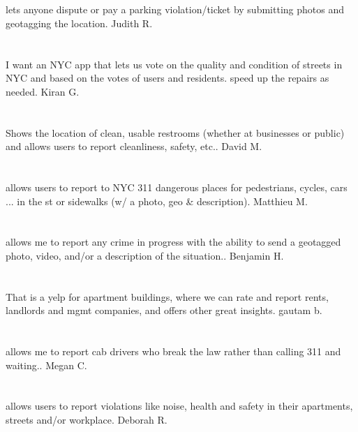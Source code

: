 \section{}lets anyone dispute or pay a parking violation/ticket by submitting photos and geotagging the location. Judith R.
\section{} I want an NYC app that lets us vote on the quality and condition of streets in NYC and based on the votes of users and residents.  speed up the repairs as needed.  Kiran G.
\section{}Shows the location of clean,  usable restrooms (whether at businesses or public) and allows users to report cleanliness,  safety,  etc.. David M.
\section{}allows users to report to NYC 311 dangerous places for pedestrians,  cycles,  cars ... in the st or sidewalks (w/ a photo,  geo \& description). Matthieu M.
\section{} allows me to report any crime in progress with the ability to send a geotagged photo,  video,  and/or a description of the situation.. Benjamin H.
\section{}That is a yelp for apartment buildings,  where we can rate and report rents,  landlords and mgmt companies,  and offers other great insights. gautam b.
\section{}allows me to report cab drivers who break the law rather than calling 311 and waiting.. Megan C.
\section{}allows users to report violations like noise,  health and safety in their apartments,  streets and/or workplace. Deborah R.
